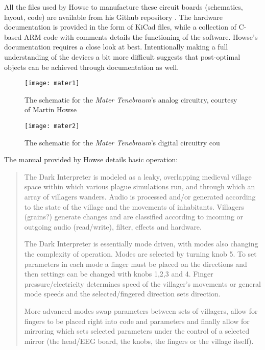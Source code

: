 All the files used by Howse to manufacture these circuit boards (schematics, layout, code) are available from his Github repository \citep{howse}. The hardware documentation is provided in the form of KiCad files, while a collection of C-based ARM code with comments details the functioning of the software. Howse's documentation requires a close look at best. Intentionally making a full understanding of the devices a bit more difficult suggests that post-optimal objects can be achieved through documentation as well. 

	\begin{figure}[H]
	  \centering
	    \texttt{[image: mater1]}
	    \caption{The schematic for the \textit{Mater Tenebraum}'s analog circuitry, courtesy of Martin Howse}
	\end{figure}
	
	\begin{figure}[H]
	  \centering
	    \texttt{[image: mater2]}
	    \caption{The schematic for the \textit{Mater Tenebraum}'s digital circuitry cou}
	\end{figure}
	
The manual provided by Howse details basic operation: 

\begin{quote}

The Dark Interpreter is modeled as a leaky, overlapping medieval village space within which various plague simulations run, and through which an array of villagers wanders. Audio is processed and/or generated according to the state of the village and the movements of inhabitants. Villagers (grains?) generate changes and are classified according to incoming or outgoing audio (read/write), filter, effects and hardware.

The Dark Interpreter is essentially mode driven, with modes also changing the complexity of operation. Modes are selected by turning knob 5. To set parameters in each mode a finger must be placed on the directions and then settings can be changed with knobs 1,2,3 and 4. Finger pressure/electricity determines speed of the villager’s movements or general mode speeds and the selected/fingered direction sets direction.

More advanced modes swap parameters between sets of villagers, allow for fingers to be placed right into code and parameters and finally allow for mirroring which sets selected parameters under the control of a selected mirror (the head/EEG board, the knobs, the fingers or the village itself).

\end{quote}

